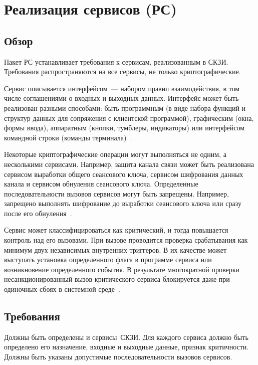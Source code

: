 \section{Реализация сервисов (РС)}\label{SV}

\subsection{Обзор}\label{SV.Intro}

Пакет РС устанавливает требования к сервисам, реализованным в СКЗИ.
%
Требования распространяются на все сервисы, не только криптографические.

Сервис описывается интерфейсом~--- набором правил взаимодействия,
в том числе соглашениями о входных и выходных данных.
%
Интерфейс может быть реализован разными способами:
%
быть программным (в виде набора функций и структур данных для сопряжения
с клиентской программой), графическим (окна, формы ввода),
аппаратным (кнопки, тумблеры, индикаторы)
или интерфейсом командной строки (команды терминала)~.

Некоторые криптографические операции могут выполняться не одним, а несколькими 
сервисами.  Например, защита канала связи может быть реализована сервисом 
выработки общего сеансового ключа, сервисом шифрования данных канала
и сервисом обнуления сеансового ключа.
%
Определенные последовательности вызовов сервисов могут быть 
запрещены. Например, запрещено выполнять шифрование до 
выработки сеансового ключа или сразу после его обнуления~.

Сервис может классифицироваться как критический, и тогда повышается
контроль над его вызовами. 
%
При вызове проводится проверка срабатывания как минимум двух 
независимых внутренних триггеров. В их качестве может выступать установка 
определенного флага в программе сервиса или возникновение определенного 
события.
%
В результате многократной проверки несанкционированный вызов критического
сервиса блокируется даже при одиночных сбоях в системной 
среде~.

\subsection{Требования}\label{SV.Reqs}

\label{R.SV.List}
Должны быть определены и   
сервисы~СКЗИ.
%
Для каждого сервиса должно быть определено его назначение, 
входные и выходные данные, признак критичности.
%
Должны быть указаны допустимые последовательности вызовов сервисов.


